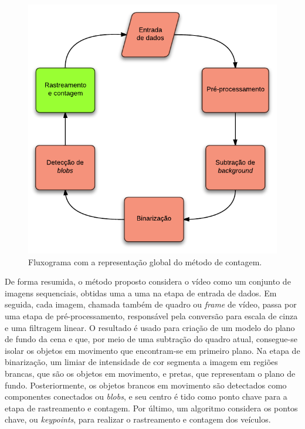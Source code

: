 \begin{figure}[ht]
  \begin{center}
    \includegraphics[scale=0.9]{imgs/general_process.pdf}
  \end{center}
  \caption{Fluxograma com a representação global do método de contagem.}
  \label{fig:general_process}
\end{figure}

De forma resumida, o método proposto considera o vídeo como um conjunto de imagens sequenciais, obtidas uma a uma na etapa de entrada de dados. Em seguida, cada imagem, chamada também de quadro ou \textit{frame} de vídeo, passa por uma etapa de pré-processamento, responsável pela conversão para escala de cinza e uma filtragem linear. O resultado é usado para criação de um modelo do plano de fundo da cena e que, por meio de uma subtração do quadro atual, consegue-se isolar os objetos em movimento que encontram-se em primeiro plano. Na etapa de binarização, um limiar de intensidade de cor segmenta a imagem em regiões brancas, que são os objetos em movimento, e pretas, que representam o plano de fundo. Posteriormente, os objetos brancos em movimento são detectados como componentes conectados ou \textit{blobs}, e seu centro é tido como ponto chave para a etapa de rastreamento e contagem. Por último, um algoritmo considera os pontos chave, ou \textit{keypoints}, para realizar o rastreamento e contagem dos veículos.

